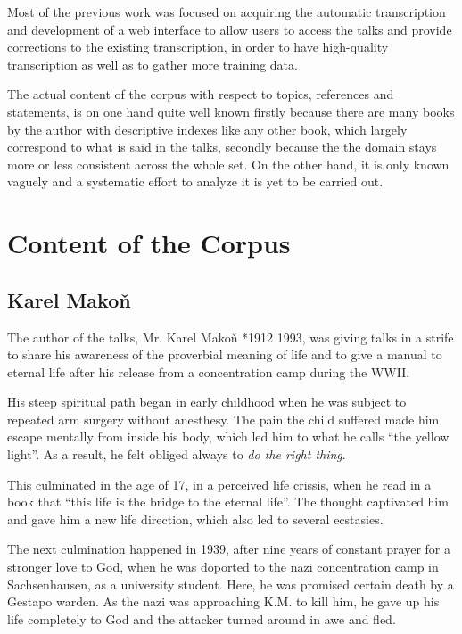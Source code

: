 \documentclass[a4paper,11pt]{article}
\begin{document}
Most of the previous work was focused on acquiring the automatic transcription
and development of a web interface to allow users to access the talks and
provide corrections to the existing transcription, in order to have high-quality
transcription as well as to gather more training data.

The actual content of the corpus with respect to topics, references and
statements, is on one hand quite well known firstly because there are many books
by the author with descriptive indexes like any other book, which largely
correspond to what is said in the talks, secondly because the the domain stays
more or less consistent across the whole set. On the other hand, it is only
known vaguely and a systematic effort to analyze it is yet to be carried out.

\section{Content of the Corpus}

\subsection{Karel Mako\v{n}}

The author of the talks, Mr. Karel Mako\v{n} *1912 \textdagger{}1993, was giving
talks in a strife to share his awareness of the proverbial meaning of life and
to give a manual to eternal life after his release from a concentration camp
during the WWII.

His steep spiritual path began in early childhood when he was
subject to repeated arm surgery without anesthesy. The pain the child suffered
made him escape mentally from inside his body, which led him to what he calls
``the yellow light''. As a result, he felt obliged always to {\em do the right
thing}.

This culminated in the age of 17, in a perceived life crissis, when he read in a
book that ``this life is the bridge to the eternal life''. The thought
captivated him and gave him a new life direction, which also led to several
ecstasies.

The next culmination happened in 1939, after nine years of constant prayer for a
stronger love to God, when he was doported to the nazi concentration camp in
Sachsenhausen, as a university student. Here, he was promised certain death by a
Gestapo warden. As the nazi was approaching K.M. to kill him, he gave up his
life completely to God and the attacker turned around in awe and fled.
\end{document}
